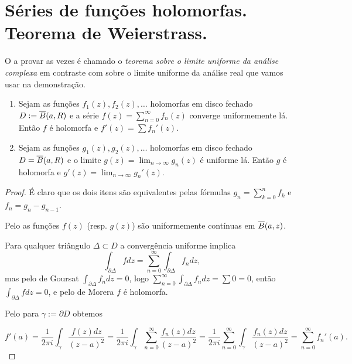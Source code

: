 \section{Séries de funções holomorfas. Teorema de Weierstrass.}


O  a provar as vezes é chamado
o \emph{teorema sobre o limite uniforme da análise complexa}
em contraste com  sobre o limite uniforme da análise real
que vamos usar na demonstração.

\begin{lema}
\label{l:uniforme}
\begin{enumerate}
\item
Sejam as funções $f_1(z),f_2(z),\dots$ holomorfas em disco fechado
$D := \overline{B}(a,R)$ e a série $f(z) = \sum_{n=0}^\infty f_n(z)$ converge uniformemente lá.
Então $f$ é holomorfa e $f'(z) = \sum f_n'(z)$.
\item
Sejam as funções $g_1(z),g_2(z),\dots$ holomorfas em disco fechado
$D = \overline{B}(a,R)$ e o limite $g(z) = \lim_{n\to\infty} g_n(z)$ é uniforme lá.
Então $g$ é holomorfa e $g'(z) = \lim_{n\to\infty} g_n'(z)$.
\end{enumerate}
\end{lema}
\begin{proof}
É claro que os dois itens são equivalentes pelas fórmulas
$g_n = \sum_{k=0}^n f_k$ e $f_n = g_n - g_{n-1}$.

Pelo 
as funções $f(z)$ (resp. $g(z)$) são uniformemente contínuas em $\overline{B}(a,z)$.

Para qualquer triângulo $\Delta \subset D$ a convergência uniforme implica
\[ \int_{\partial \Delta} f dz = \sum_{n=0}^\infty \int_{\partial \Delta} f_n dz, \]
mas pelo  de Goursat $\int_{\partial \Delta} f_n dz = 0$,
logo $\sum_{n=0}^\infty \int_{\partial \Delta} f_n dz = \sum 0 = 0$,
então $\int_{\partial \Delta} f dz = 0$,
e pelo  de Morera $f$ é holomorfa.

Pelo  para $\gamma := \partial D$ obtemos

\[ f'(a) = \frac1{2\pi i} \int_{\gamma} \frac{f(z)dz}{(z-a)^2}
= \frac1{2\pi i} \int_{\gamma} \sum_{n=0}^\infty \frac{f_n(z)dz}{(z-a)^2}
= \frac1{2\pi i} \sum_{n=0}^\infty \int_{\gamma} \frac{f_n(z)dz}{(z-a)^2}
= \sum_{n=0}^\infty f_n'(a). \]
\end{proof}

